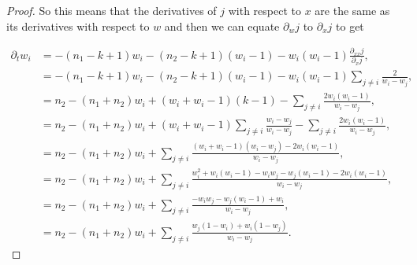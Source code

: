 \begin{proof}
    So this means that the derivatives of $j$ with respect to $x$ are the same as its derivatives with respect to $w$ and then we can equate $\partial_w j$ to $\partial_x j$ to get

    \begin{align*}
        \partial_t w_i &= -(n_1-k+1)w_i - (n_2 -k+1)(w_i-1) - w_i(w_i-1)\frac{\partial_{xx} j}{\partial_x j},\\ 
        &=-(n_1-k+1)w_i - (n_2 -k+1)(w_i-1) - w_i(w_i-1)\sum_{j \neq i} \frac{2}{w_i - w_j},\\ 
        &= n_2 - (n_1 + n_2)w_i + (w_i + w_i -1)(k-1) - \sum_{j\neq i} \frac{2w_i(w_i -1)}{w_i - w_j},\\
        &= n_2 - (n_1 + n_2)w_i + (w_i + w_i -1)\sum_{j \neq i}\frac{w_i - w_j}{w_i - w_j} - \sum_{j\neq i} \frac{2w_i(w_i -1)}{w_i - w_j},\\ 
        &= n_2 - (n_1 + n_2)w_i + \sum_{j \neq i}\frac{ (w_i + w_i -1)(w_i - w_j) - 2 w_i(w_i-1) }{w_i - w_j},\\ 
        &= n_2 - (n_1 + n_2)w_i + \sum_{j \neq i}\frac{ w_i^2 + w_i(w_i-1) - w_iw_j -w_j(w_i-1) -2w_i(w_i-1) }{w_i - w_j},\\
        &=  n_2 - (n_1 + n_2)w_i + \sum_{j \neq i}\frac{ - w_iw_j - w_j(w_i-1) +w_i }{w_i - w_j},\\
        &= n_2 - (n_1 + n_2)w_i + \sum_{j \neq i}\frac{w_j(1-w_i) +w_i(1-w_j)}{w_i - w_j}.
    \end{align*}

\end{proof}
    

